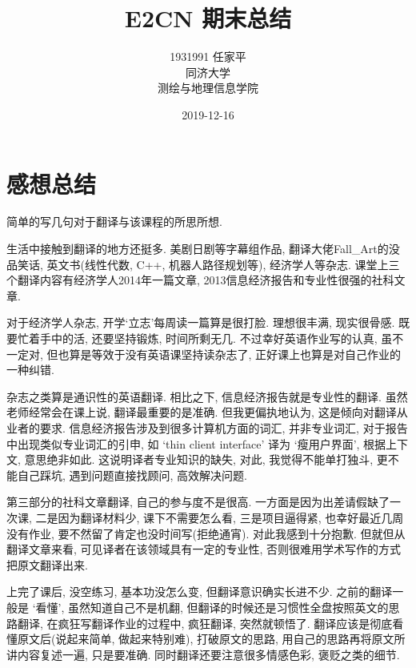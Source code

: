 \documentclass[a4paper, 12pt, UTF8]{article}
\begin{document}
\title{\Huge E2CN 期末总结}
\author{\Large 
        1931991 任家平 \\[12pt]
        同济大学 \\[12pt]
        测绘与地理信息学院}
\date{2019-12-16}
\maketitle
\thispagestyle{empty}

\newpage
{}
\tableofcontents

\newpage
{}
\section{感想总结}
简单的写几句对于翻译与该课程的所思所想.

生活中接触到翻译的地方还挺多. 美剧日剧等字幕组作品, 翻译大佬Fall\_Art的没品笑话, 英文书(线性代数, C++, 机器人路径规划等), 经济学人等杂志. 课堂上三个翻译内容有经济学人2014年一篇文章, 2013信息经济报告和专业性很强的社科文章. 

对于经济学人杂志, 开学`立志'每周读一篇算是很打脸. 理想很丰满, 现实很骨感. 既要忙着手中的活, 还要坚持锻炼, 时间所剩无几. 不过幸好英语作业写的认真, 虽不一定对, 但也算是等效于没有英语课坚持读杂志了, 正好课上也算是对自己作业的一种纠错. 

杂志之类算是通识性的英语翻译. 相比之下, 信息经济报告就是专业性的翻译. 虽然老师经常会在课上说, 翻译最重要的是准确. 但我更偏执地认为, 这是倾向对翻译从业者的要求. 信息经济报告涉及到很多计算机方面的词汇, 并非专业词汇, 对于报告中出现类似专业词汇的引申, 如 `thin client interface' 译为 `瘦用户界面', 根据上下文, 意思绝非如此. 这说明译者专业知识的缺失, 对此, 我觉得不能单打独斗, 更不能自己踩坑, 遇到问题直接找顾问, 高效解决问题.

第三部分的社科文章翻译, 自己的参与度不是很高. 一方面是因为出差请假缺了一次课, 二是因为翻译材料少, 课下不需要怎么看, 三是项目逼得紧, 也幸好最近几周没有作业, 要不然留了肯定也没时间写(拒绝通宵). 对此我感到十分抱歉. 但就但从翻译文章来看, 可见译者在该领域具有一定的专业性, 否则很难用学术写作的方式把原文翻译出来. 

上完了课后, 没空练习, 基本功没怎么变, 但翻译意识确实长进不少. 之前的翻译一般是 `看懂', 虽然知道自己不是机翻, 但翻译的时候还是习惯性全盘按照英文的思路翻译, 在疯狂写翻译作业的过程中, 疯狂翻译, 突然就顿悟了. 翻译应该是彻底看懂原文后(说起来简单, 做起来特别难), 打破原文的思路, 用自己的思路再将原文所讲内容复述一遍, 只是要准确. 同时翻译还要注意很多情感色彩, 褒贬之类的细节.
\end{document}
